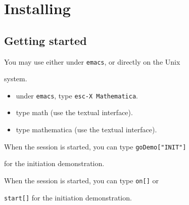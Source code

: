 \chapter{Installing \mmalfa{}}

\label{appendixtechset}

\label{install}



\newcommand{\mmalpha}{{MMalpha}}





\section{Getting started}

You may use either {\mma} under {\tt emacs}, or directly on the Unix 

system. 

\begin{itemize}

\item under {\tt emacs}, type {\tt  esc-X Mathematica}. 

\item type math (use the {\mma} textual interface).

\item type mathematica (use the {\mma} textual interface).

\end{itemize}



When the {\mma} session is started, you can type {\tt goDemo["INIT"]}

for the initiation demonstration.



When the {\mma} session is started, you can type {\tt on[]} or

\texttt{start[]} for the initiation demonstration.

